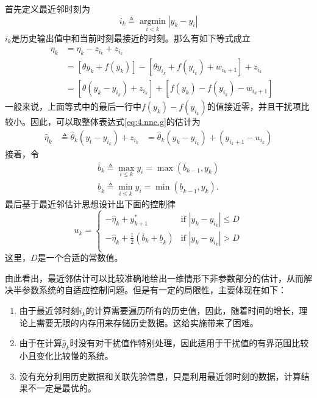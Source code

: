 首先定义最近邻时刻为
\begin{equation}\label{eq:4.it}
i_k\triangleq\mathop{\arg \min}\limits_{i<k}|y_k-y_i|
\end{equation}
$i_k$是历史输出值中和当前时刻最接近的时刻。那么有如下等式成立
\begin{equation*}
\begin{array}{lll}
&\eta_k&=\eta_k-z_{i_k}+z_{i_k}\\
&&=[\theta y_k+f(y_k)]-[\theta y_{i_k}+f(y_{i_k})+w_{i_k+1}]+z_{i_k}\\
&&=[\theta(y_k-y_{i_k})+z_{i_k}]+[f(y_k)-f(y_{i_k})-w_{i_k+1}]
\end{array}
\end{equation*}
一般来说，上面等式中的最后一行中$f(y_k)-f(y_{i_k})$的值接近零，并且干扰项比较小。因此，可以取整体表达式\eqref{eq:4.nne.g}的估计为
\begin{equation}\label{eq.4:g.est}
\begin{array}{lll}
\hat{\eta}_k&\triangleq\hat{\theta}_k(y_t-y_{i_k})+z_{i_k}
&=\hat{\theta}_{k}(y_k-y_{i_k})+(y_{i_k+1}-u_{i_k})
\end{array}
\end{equation}
接着，令
\begin{equation}\label{eq.4:bk}
\begin{array}{lll}
\bar{b}_k\triangleq \max\limits_{i\leq k}y_i
         =\max(\bar{b}_{k-1}, y_k)\\
\underline{b}_k\triangleq \min\limits_{i\leq k}{y_i}
                =\min(\underline{b}_{k-1}, y_k).
\end{array} 
\end{equation}
最后基于最近邻估计思想设计出下面的控制律
\begin{equation}\label{eq:4.uk}
u_{k}=\left\{
\begin{array}{cc}
  -\hat \eta_k+y_{k+1}^* & \text{if } |y_k-y_{i_k}|\le D \\
  -\hat \eta_k+\frac12(\bar b_k+\underline b_k) & \text{if } |y_k-y_{i_k}|> D \\
\end{array}
\right.
\end{equation}
这里，$D$是一个合适的常数值。

由此看出，最近邻估计可以比较准确地给出一维情形下非参数部分的估计，从而解决半参数系统的自适应控制问题。但是有一定的局限性，主要体现在如下：
\begin{enumerate}
\item 由于最近邻时刻$i_k$的计算需要遍历所有的历史值，因此，随着时间的增长，理论上需要无限的内存用来存储历史数据。这给实施带来了困难。
\item 由于在计算$\hat{g}_k$时没有对干扰值作特别处理，因此适用于干扰值的有界范围比较小且变化比较慢的系统。
\item 没有充分利用历史数据和关联先验信息，只是利用最近邻时刻的数据，计算结果不一定是最优的。
\end{enumerate}

